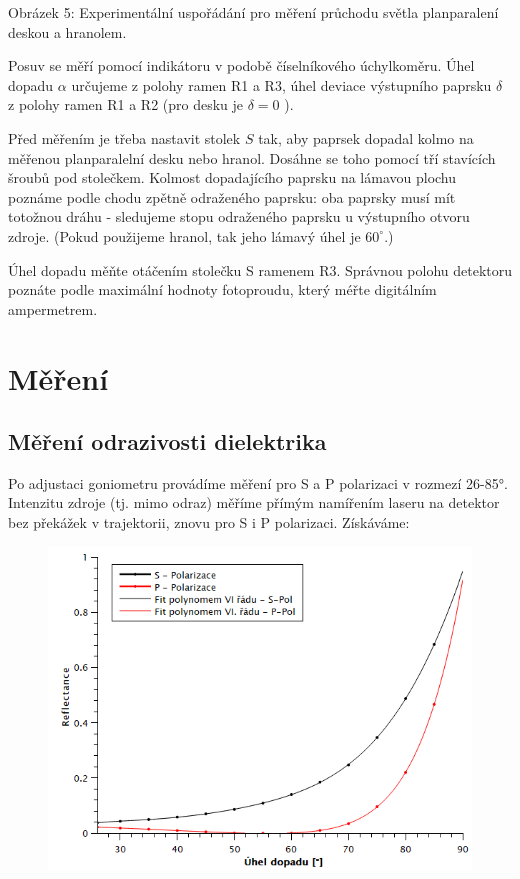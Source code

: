 \documentclass[czech,11pt,a4paper]{article}
\begin{document}
\begin{multicols}{2}
		Obrázek 5: Experimentální uspořádání pro měření průchodu světla planparalení deskou a hranolem.
		
		Posuv se měří pomocí indikátoru v podobě číselníkového úchylkoměru. Úhel dopadu $\alpha$ určujeme z polohy ramen R1 a R3, úhel deviace výstupního paprsku $\delta$ z polohy ramen R1 a R2 (pro desku je $\delta=0$ ).
		
		Před měřením je třeba nastavit stolek $S$ tak, aby paprsek dopadal kolmo na měřenou planparalelní desku nebo hranol. Dosáhne se toho pomocí tří stavících šroubů pod stolečkem. Kolmost dopadajícího paprsku na lámavou plochu poznáme podle chodu zpětně odraženého paprsku: oba paprsky musí mít totožnou dráhu - sledujeme stopu odraženého paprsku u výstupního otvoru zdroje. (Pokud použijeme hranol, tak jeho lámavý úhel je $60^{\circ}$.)
		
		Úhel dopadu měňte otáčením stolečku S ramenem R3. Správnou polohu detektoru poznáte podle maximální hodnoty fotoproudu, který méřte digitálním ampermetrem.
		\section{Měření}
		\subsection{Měření odrazivosti dielektrika}
		Po adjustaci goniometru provádíme měření pro S a P polarizaci v rozmezí 26-85°. Intenzitu zdroje (tj. mimo odraz) měříme přímým namířením laseru na detektor bez překážek v trajektorii, znovu pro S i P polarizaci. Získáváme:
		\begin{figure}[H]
			\includegraphics[width=1\linewidth, center]{Reflectance}
		\end{figure}
		

\end{multicols}
\end{document}
